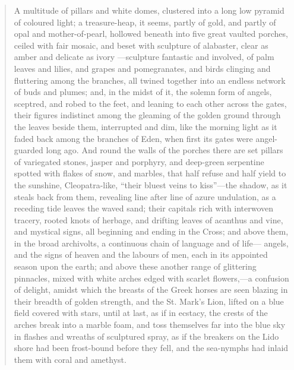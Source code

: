 \begin{quote}
A multitude of pillars and white domes, clustered into a long low
pyramid of coloured light; a treasure-heap, it seems, partly of gold,
and partly of opal and mother-of-pearl, hollowed beneath into five
great vaulted porches, ceiled with fair mosaic, and beset with
sculpture of alabaster, clear as amber and delicate as ivory —sculpture
fantastic and involved, of palm leaves and lilies, and grapes and
pomegranates, and birds clinging and fluttering among the branches, all
twined together into an endless network of buds and plumes; and, in the
midst of it, the solemn form of angels, sceptred, and robed to the
feet, and leaning to each other across the gates, their figures
indistinct among the gleaming of the golden ground through the leaves
beside them, interrupted and dim, like the morning light as it faded
back among the branches of Eden, when first its gates were
angel-guarded long ago.  And round the walls of the porches there are
set pillars of variegated stones, jasper and porphyry, and deep-green
serpentine spotted with flakes of snow, and marbles, that half refuse
and half yield to the sunshine, Cleopatra-like, ``their
bluest veins to kiss''---the shadow, as it steals back from
them, revealing line after line of azure undulation, as a receding tide
leaves the waved sand; their capitals rich with interwoven tracery,
rooted knots of herbage, and drifting leaves of acanthus and vine, and
mystical signs, all beginning and ending in the Cross; and above them,
in the broad archivolts, a continuous chain of language and of life—
angels, and the signs of heaven and the labours of men, each in its
appointed season upon the earth; and above these another range of
glittering pinnacles, mixed with white arches edged with scarlet
flowers,—a confusion of delight, amidst which the breasts of the Greek
horses are seen blazing in their breadth of golden strength, and the
St. Mark's Lion, lifted on a blue field covered with
stars, until at last, as if in ecstacy, the crests of the arches break
into a marble foam, and toss themselves far into the blue sky in
flashes and wreaths of sculptured spray, as if the breakers on the Lido
shore had been frost-bound before they fell, and the sea-nymphs had
inlaid them with coral and amethyst.  \citep[][vol. 2, ch. 4, sec. 14]{ruskin1885}
\end{quote}


